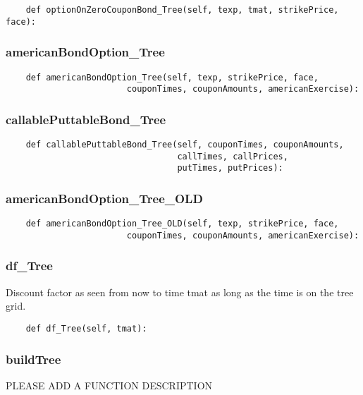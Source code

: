 \documentclass[twoside,11pt]{book}
\begin{document}
\begin{lstlisting}
    def optionOnZeroCouponBond_Tree(self, texp, tmat, strikePrice, face):
\end{lstlisting}

\subsubsection*{{\bf americanBondOption\_Tree}}


\begin{lstlisting}
    def americanBondOption_Tree(self, texp, strikePrice, face,
                        couponTimes, couponAmounts, americanExercise):
\end{lstlisting}

\subsubsection*{{\bf callablePuttableBond\_Tree}}


\begin{lstlisting}
    def callablePuttableBond_Tree(self, couponTimes, couponAmounts,
                                  callTimes, callPrices,
                                  putTimes, putPrices):
\end{lstlisting}

\subsubsection*{{\bf americanBondOption\_Tree\_OLD}}


\begin{lstlisting}
    def americanBondOption_Tree_OLD(self, texp, strikePrice, face,
                        couponTimes, couponAmounts, americanExercise):
\end{lstlisting}

\subsubsection*{{\bf df\_Tree}}
Discount factor as seen from now to time tmat as long as the time is on the tree grid.  

\begin{lstlisting}
    def df_Tree(self, tmat):
\end{lstlisting}

\subsubsection*{{\bf buildTree}}
PLEASE ADD A FUNCTION DESCRIPTION
\end{document}
